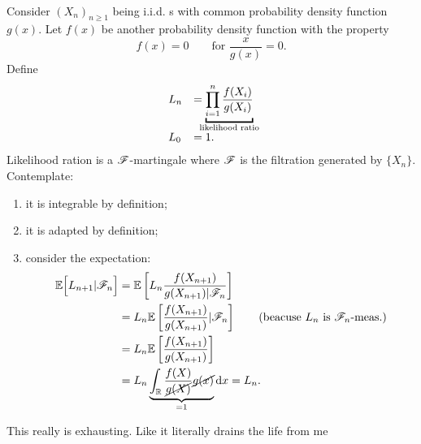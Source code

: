 \documentclass{report}
\begin{document}
\begin{enumerate}
\begin{enumerate}
\begin{align*}
		\end{align*}
	\end{enumerate}
	\begin{example}
		Consider ${(X_{n})}_{n\geq 1}$ being i.i.d. \rv s with common probability density function $g(x)$. Let $f(x)$ be another probability density function with the property
		\[f(x)=0\qquad\text{for }\frac{x}{g(x)}=0.\]
		Define
		\begin{equation*}
			\begin{array}{l l}
				L_n&=\underbracket{\prod_{i=1}^{n}\frac{f(X_i)}{g(X_{i})}}_{\mathclap{\text{likelihood ratio}}}\\
				L_0&=1.
			\end{array}
		\end{equation*}
		Likelihood ration is a $\mathscr{F}$-martingale where $\mathscr{F}$ is the filtration generated by $\{X_{n}\}$. Contemplate:
		\begin{enumerate}
			\item it is integrable by definition;
			\item it is adapted by definition;
			\item consider the expectation:
			\begin{align*}
				\mathbb{E}\Big[L_{n+1}|\mathscr{F}_{n}\Big]&=\mathbb{E}\left[L_{n}\frac{f(X_{n+1})}{g(X_{n+1})|\mathscr{F}_{n}}\right]\\
				&=L_{n}\mathbb{E}\left[\frac{f(X_{n+1})}{g(X_{n+1})}|\mathscr{F}_{n}\right]\qquad\text{(beacuse $L_n$ is $\mathscr{F}_n$-meas.)}\\
				&=L_{n}\mathbb{E}\left[\frac{f(X_{n+1})}{g(X_{n+1})}\right]\\
				&=L_{n}\underbrace{\int_{\mathbb{R}}\frac{f(X)}{\cancel{g(X)}}\cancel{g(x)}}_{=1}\mathop{}\!\mathrm{d} x=L_{n}.
			\end{align*}
		\end{enumerate}
	\end{example}
\end{enumerate}
This really is exhausting. Like it literally drains the life from me
\end{document}
